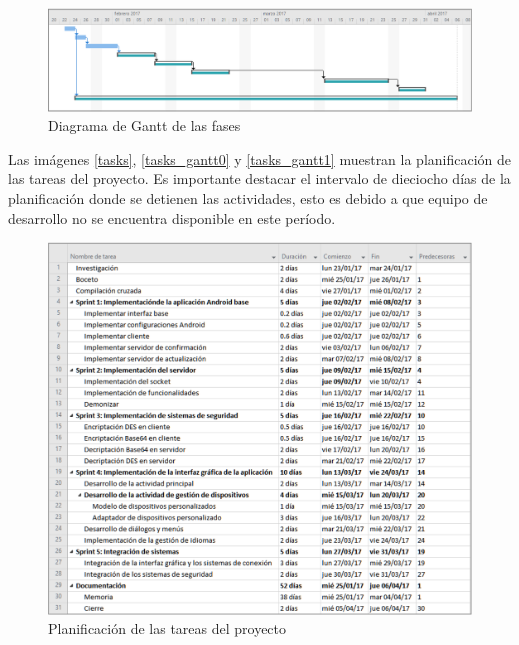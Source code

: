 \documentclass[12pt]{article}
\begin{document}
        \begin{figure}[h!]
            \centering
                \includegraphics[scale=0.7]{fases_gantt.eps}
                \caption*{Diagrama de Gantt de las fases}
                \label{fig:fases_gantt}
        \end{figure}

        Las imágenes \ref{tasks}, \ref{tasks_gantt0} y \ref{tasks_gantt1} muestran la planificación de las tareas del proyecto. Es importante destacar el intervalo de dieciocho días de la planificación donde se detienen las actividades, esto es debido a que equipo de desarrollo no se encuentra disponible en este período.

        \begin{figure}[h!]
            \centering
                \includegraphics[scale=0.7]{tasks.eps}
                \caption*{Planificación de las tareas del proyecto}
                \label{fig:tasks}
        \end{figure}
\end{document}
